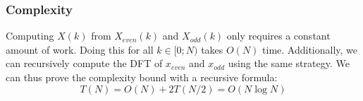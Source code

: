 \subsubsection{Complexity}

Computing $X(k)$ from $X_\textit{even}(k)$ and $X_\textit{odd}(k)$
only requires a constant amount of work.
Doing this for all $k \in [0;N)$ takes $O(N)$ time.
Additionally, we can recursively compute the DFT of $x_\textit{even}$ and $x_\textit{odd}$
using the same strategy.
We can thus prove the complexity bound with a recursive formula:
\begin{equation}
    T(N) = O(N) + 2T(N/2) = O(N \log N)
\end{equation}
